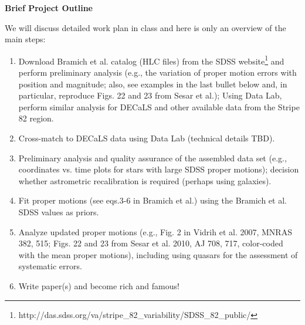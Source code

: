\documentclass[10pt]{article}
\begin{document}
\vskip 0.2in
{\bf Brief Project Outline}

We will discuss detailed work plan in class and here is only an overview of the
main steps: 
\begin{enumerate}
\item Download Bramich et al. catalog (HLC files) from the SDSS
website\footnote{http://das.sdss.org/va/stripe\_82\_variability/SDSS\_82\_public/}
and perform preliminary analysis (e.g., the variation of proper motion errors with 
 position and magnitude; also, see examples in the last bullet below and, in particular,
    reproduce Figs. 22 and 23 from Sesar et al.); Using Data Lab, perform similar analysis
     for DECaLS and other available data from the Stripe 82 region.
\item Cross-match to DECaLS data using Data Lab (technical details TBD). 
\item Preliminary analysis and quality assurance of the assembled data set (e.g., 
          coordinates vs. time plots for stars with large SDSS proper motions); 
          decision whether astrometric recalibration is required (perhaps using galaxies). 
\item Fit proper motions (see eqs.3-6 in Bramich et al.)  using the Bramich et al. SDSS values as priors. 
\item Analyze updated proper motions (e.g., Fig. 2 in Vidrih et al. 2007, MNRAS 382, 515;
   Figs. 22 and 23 from Sesar et al. 2010, AJ 708, 717, color-coded with the mean proper 
   motions), including using quasars for the assessment of systematic errors. 
\item Write paper(s) and become rich and famous! 
\end{enumerate}
\end{document}
